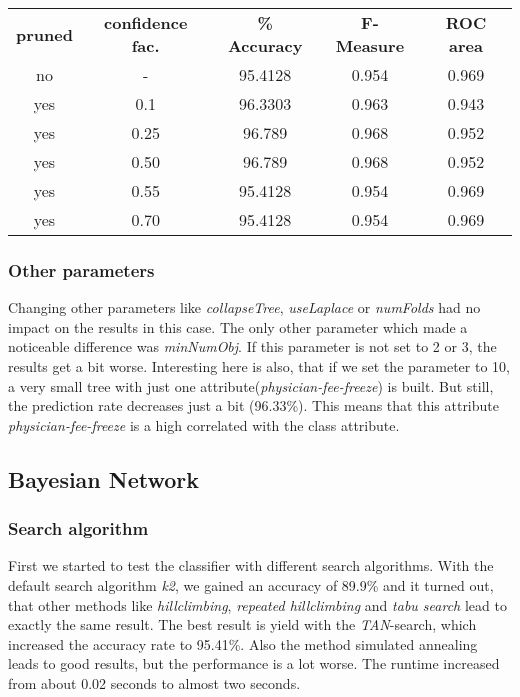 \documentclass{article}
\begin{document}
\begin{center}
\begin{tabular}{ c | c | c | c | c }
\textbf{pruned} & \textbf{confidence fac.} & \textbf{\% Accuracy} & \textbf{F-Measure} & \textbf{ROC area}\\
no & - & 95.4128 & 0.954 & 0.969 \\
yes & 0.1 & 96.3303 & 0.963 & 0.943 \\
yes & 0.25 & 96.789 & 0.968 & 0.952 \\	
yes & 0.50 & 96.789 & 0.968 & 0.952 \\
yes & 0.55 & 95.4128 & 0.954 & 0.969 \\
yes & 0.70 & 95.4128 & 0.954 & 0.969 \\
\end{tabular}
\end{center} 

\subsubsection{Other parameters}
 
Changing other parameters like \emph{collapseTree}, \emph{useLaplace} or \emph{numFolds} had no impact on the results in this case. The only other parameter which made a noticeable difference was \emph{minNumObj}. If this parameter is not set to 2 or 3, the results get a bit worse. Interesting here is also, that if we set the parameter to 10, a very small tree with just one attribute(\emph{physician-fee-freeze}) is built. But still, the prediction rate decreases just a bit (96.33\%). This means that this attribute \emph{physician-fee-freeze} is a high correlated with the class attribute. 
 
 
\subsection{Bayesian Network}
 
\subsubsection{Search algorithm}
 
First we started to test the classifier with different search algorithms. With the default search algorithm \emph{k2}, we gained an accuracy of 89.9\% and it turned out, that other methods like \emph{hillclimbing}, \emph{repeated hillclimbing} and \emph{tabu search} lead to exactly the same result. The best result is yield with the \emph{TAN}-search, which increased the accuracy rate to 95.41\%. Also the method simulated annealing leads to good results, but the performance is a lot worse. The runtime increased from about 0.02 seconds to almost two seconds. 
 
\end{document}
